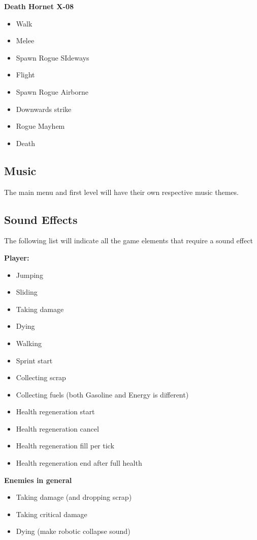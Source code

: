 \documentclass[../Main.tex]{subfiles}
\begin{document}
\textbf{Death Hornet X-08}
\begin{itemize}
	\item Walk
	\item Melee
	\item Spawn Rogue SIdeways
	\item Flight
	\item Spawn Rogue Airborne
	\item Downwards strike
	\item Rogue Mayhem
	\item Death
\end{itemize}


\subsection{Music}

The main menu and first level will have their own respective music themes. 

\subsection{Sound Effects}

The following list will indicate all the game elements that require a sound effect\newline

\textbf{Player:}
\begin{itemize}
	\item Jumping
	\item Sliding
	\item Taking damage
	\item Dying
	\item Walking
	\item Sprint start
	\item Collecting scrap
	\item Collecting fuels (both Gasoline and Energy is different)
	\item Health regeneration start
	\item Health regeneration cancel
	\item Health regeneration fill per tick
	\item Health regeneration end after full health
\end{itemize}

\textbf{Enemies in general}
\begin{itemize}
	\item Taking damage (and dropping scrap)
	\item Taking critical damage
	\item Dying (make robotic collapse sound)
\end{itemize}
\end{document}
